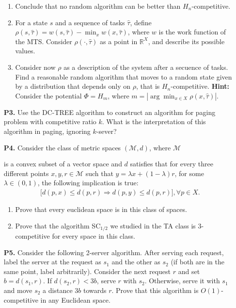 \documentclass[11pt, spanish]{article}
\theoremstyle{plain}
\newcommand{\R}{\mathds{R}}
\begin{document}
\begin{itemize}
\begin{enumerate}
      \item Conclude that no random algorithm can be better than $H_n$-competitive.
      \item For a state $s$ and a sequence of tasks $\hat{\tau}$, define
	$\rho(s,\hat{\tau})= w(s,\hat{\tau}) - \min_x w(x,\hat{\tau})$, where
	$w$ is the work function of the MTS. Consider $\rho(\cdot,\hat{\tau})$ as
	a point in $\R^X$, and describe its possible values.
      \item Consider now $\rho$ as a description of the system after a secuence
	of tasks. Find a reasonable random algorithm that moves to a random
	state given by a distribution that depends only on $\rho$, that is
	$H_n$-competitive. \textbf{Hint:} Consider the potential $\Phi=H_m$, where
	$m= | \arg\min_{x\in X} \rho(x,\hat{\tau}) |$.
    \end{enumerate}

  \item[\textbf{P3.}] Use the DC-TREE algorithm to construct an algorithm for paging problem with competitive ratio $k$. What is the interpretation of this algorithm in paging, ignoring $k$-sever?

  \item[\textbf{P4.}] Consider the class of metric spaces $(\mathcal{M},d)$, where $\mathcal{M}$

  is a convex subset of a vector space and $d$ satisfies that for every three different points
  $x,y,r\in \mathcal{M}$ such that $y= \lambda x + (1-\lambda)r$, for some $\lambda\in (0,1)$,
  the following implication is true:
  \begin{align*}
    \big[ d(p,x) \leq d(p,r) \Rightarrow d(p,y) \leq d(p,r)  \big], \forall p\in X.
  \end{align*}
  \begin{enumerate}
    \item Prove that every euclidean space is in this class of
  	spaces.
      \item Prove that the algorithm SC$_{1/2}$ we studied in the TA class is 3-competitive
	for every space in this class.
    \end{enumerate}

  \item[\textbf{P5.}] Consider the following 2-server algorithm. After serving each request,
    label the server at the request as $s_1$ and the other as $s_2$ (if both are in the same
    point, label arbitrarily). Consider the next request $r$ and set $b= d(s_1,r)$. If
    $d(s_2,r)< 3b$, serve $r$ with $s_2$. Otherwise, serve it with $s_1$ and move $s_2$
    a distance $3b$ towards $r$. Prove that this algorithm is $O(1)$-competitive in any
    Euclidean space.


\end{itemize}
\end{document}

